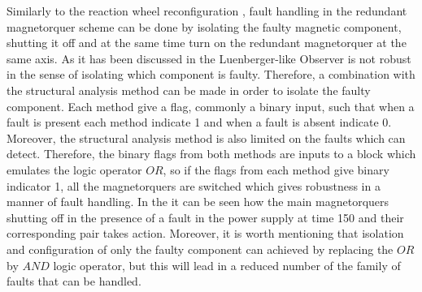 Similarly to the reaction wheel reconfiguration , fault handling in the redundant magnetorquer scheme can be done by isolating the faulty magnetic component, shutting it off and at the same time turn on the redundant magnetorquer at the same axis. As it has been discussed in  the Luenberger-like Observer is not robust in the sense of isolating which component is faulty. Therefore, a combination with the structural analysis method  can be  made in order to isolate the faulty component. Each method give a flag, commonly a binary input, such that when a fault is present each method indicate 1 and when a fault is absent indicate 0. Moreover, the structural analysis method is also limited on the faults which can detect. Therefore, the binary flags from both methods are inputs to a block which emulates the logic operator $OR$, so if the flags from each method give binary indicator 1, all the magnetorquers are switched which gives robustness in a manner of fault handling. In the  it can be seen how the main magnetorquers shutting off in the presence of a fault in the power supply at time 150 and their corresponding pair takes action. Moreover, it is worth mentioning that isolation and configuration of only the faulty component can achieved by replacing the $OR$ by $AND$ logic operator, but this will lead in a reduced number of the family of faults that can be handled. 
%
%
